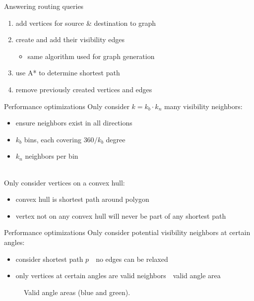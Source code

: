 \documentclass[xcolor={x11names}]{beamer}
\renewcommand{\n}{\hfill\\[0.5ex]}
\newcommand{\nn}{\hfill\\[2ex]}
\newenvironment{figcenter}
{%
	\parskip=0pt%
	\par%
	\nopagebreak%
	\centering%
}%
{%
	\par%
	\noindent%
	\ignorespacesafterend%
}
\begin{document}
		\begin{frame}{Answering routing queries}
			\begin{enumerate}
				\item add vertices for source \& destination to graph
				\item create and add their visibility edges
				\begin{itemize}
					\item[\textrightarrow] same algorithm used for graph generation
				\end{itemize}
				\item use A* to determine shortest path
				\item remove previously created vertices and edges
			\end{enumerate}
		\end{frame}
		
		\begin{frame}{Performance optimizations}
			Only consider $k = k_b \cdot k_n$ many visibility neighbors:
			\begin{itemize}
				\item ensure neighbors exist in all directions
				\item $k_b$ bins, each covering $360 / k_b$ degree
				\item $k_n$ neighbors per bin
			\end{itemize}
			\nn
			\pause
			Only consider vertices on a convex hull:\n
			\begin{itemize}
				\item convex hull is shortest path around polygon
				\item[\textrightarrow\hspace{-0.1cm}] vertex not on any convex hull will never be part of any shortest path
			\end{itemize}
		\end{frame}
		
		\begin{frame}{Performance optimizations}
			Only consider potential visibility neighbors at certain angles:\n
			\begin{itemize}
				\item consider shortest path $p$\ \textrightarrow\ no edges can be relaxed
				\item only vertices at certain angles are valid neighbors\ \textrightarrow\ valid angle area
			\end{itemize}
			\pause
			\begin{figure}[b]
				\begin{figcenter}
					\scalebox{0.7}
					{
						
					}
				\end{figcenter}
				\caption{Valid angle areas (blue and green).}
			\end{figure}
		\end{frame}
		
\end{document}
